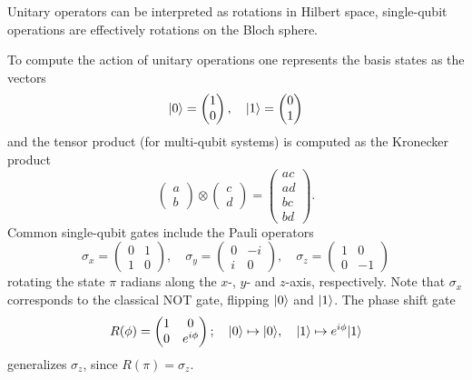 \documentclass[a4paper,10pt,oneside]{book}
\theoremstyle{plain}
\theoremstyle{definition}
\theoremstyle{remark}
\DeclarePairedDelimiter\ket{\lvert}{\rangle}
\begin{document}
Unitary operators can be interpreted as rotations in Hilbert space, single-qubit operations are effectively rotations on the Bloch sphere.

To compute the action of unitary operations one represents the basis states as the vectors
\begin{equation}
  \ket{0} = \begin{pmatrix} 1 \\ 0\end{pmatrix}, \quad \ket{1} = \begin{pmatrix} 0 \\ 1 \end{pmatrix}
\end{equation}
and the tensor product (for multi-qubit systems) is computed as the Kronecker product
\begin{equation}
  \begin{pmatrix} a \\ b \end{pmatrix} \otimes \begin{pmatrix} c \\ d \end{pmatrix}
  = \begin{pmatrix} ac \\ ad \\ bc \\ bd \end{pmatrix}.
\end{equation}
Common single-qubit gates include the Pauli operators
\begin{equation}
  \sigma_x = \begin{pmatrix} 0 & 1 \\ 1 & 0 \end{pmatrix}, \quad
  \sigma_y = \begin{pmatrix} 0 & -i \\ i & 0 \end{pmatrix}, \quad
  \sigma_z = \begin{pmatrix} 1 & 0 \\ 0 & -1 \end{pmatrix}
\end{equation}
rotating the state $\pi$ radians along the $x$-, $y$- and $z$-axis, respectively. Note that $\sigma_x$ corresponds to the classical NOT gate, flipping $\ket{0}$ and $\ket{1}$.  The phase shift gate
\begin{equation}
  R(\phi) =
  \begin{pmatrix}
    1 & 0 \\
    0 & e^{i\phi}
  \end{pmatrix};\quad
  \ket{0} \mapsto \ket{0},\quad
  \ket{1} \mapsto e^{i\phi} \ket{1}
\end{equation}
generalizes $σ_z$, since $R(\pi) = \sigma_z$.
\end{document}
